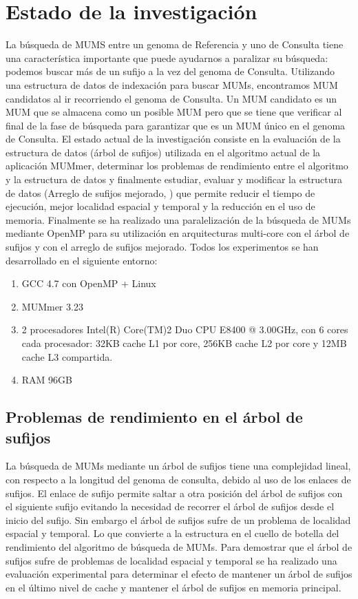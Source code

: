 \documentclass[12pt,a4paper]{article}
\begin{document}
\section{Estado de la investigación}
La búsqueda de MUMS entre un genoma de Referencia y uno de Consulta tiene una característica importante que puede ayudarnos a paralizar su búsqueda: podemos buscar más de un sufijo a la vez del genoma de Consulta. Utilizando una estructura de datos de indexación para buscar MUMs, encontramos MUM candidatos al ir recorriendo el genoma de Consulta. Un MUM candidato es un MUM que se almacena como un posible MUM pero que se tiene que verificar al final de la fase de búsqueda para garantizar que es un MUM único en el genoma de Consulta.
El estado actual de la investigación consiste en la evaluación de la estructura de datos (árbol de sufijos) utilizada en el algoritmo actual de la aplicación MUMmer, determinar los problemas de rendimiento entre el algoritmo y la estructura de datos y finalmente estudiar, evaluar y modificar la estructura de datos (Arreglo de sufijos mejorado, \cite{Abouelhoda2004}) que permite reducir el tiempo de ejecución, mejor localidad espacial y temporal y la reducción en el uso de memoria.
Finalmente se ha realizado una paralelización de la búsqueda de MUMs mediante OpenMP para su utilización en arquitecturas multi-core con el árbol de sufijos y con el arreglo de sufijos mejorado.
Todos los experimentos se han desarrollado en el siguiente entorno:
\begin{enumerate}
\item GCC 4.7 con OpenMP + Linux
\item MUMmer 3.23
\item 2 procesadores Intel(R) Core(TM)2 Duo CPU     E8400  @ 3.00GHz, con 6 cores cada procesador: 32KB cache L1 por core, 256KB cache L2 por core y 12MB cache L3 compartida.
\item RAM 96GB
\end{enumerate}
\subsection{Problemas de rendimiento en el árbol de sufijos}
La búsqueda de MUMs mediante un árbol de sufijos tiene una complejidad lineal, con respecto a la longitud del genoma de consulta, debido al uso de los enlaces de sufijos. El enlace de sufijo permite saltar a otra posición del árbol de sufijos con el siguiente sufijo evitando la necesidad de recorrer el árbol de sufijos desde el inicio del sufijo. 
Sin embargo el árbol de sufijos sufre de un problema de localidad espacial y temporal. Lo que convierte a la estructura en el cuello de botella del rendimiento del algoritmo de búsqueda de MUMs.
Para demostrar que el árbol de sufijos sufre de problemas de localidad espacial y temporal se ha realizado una evaluación experimental para determinar el efecto de mantener un árbol de sufijos en el último nivel de cache y mantener el árbol de sufijos en memoria principal.
\end{document}
